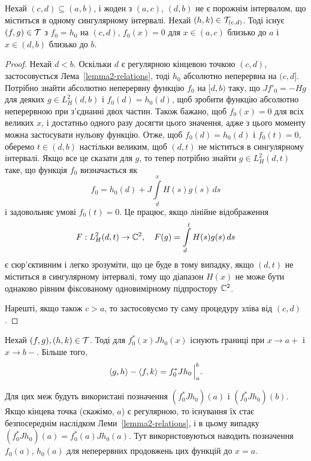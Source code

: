 \begin{lemma}\label{lemma-7-relations}
	Нехай $(c,d)\subseteq(a,b)$, і жоден з $(a,c)$, $(d,b)$ не є порожнім інтервалом, що міститься в одному сингулярному інтервалі. Нехай $(h,k)\in\mathcal{T}_{(c,d)}$. Тоді існує $(f,g)\in\mathcal{T}$ з $f_0=h_0$ на $(c,d)$, $f_0(x)=0$ для $x\in(a,c)$ близько до $a$ і $x\in(d,b)$ близько до $b$.
\end{lemma}
\begin{proof}
	Нехай $d<b$. Оскільки $d$ є регулярною кінцевою точкою $(c,d)$, застосовується Лема~\ref{lemma2-relations}, тоді $h_0$ абсолютно неперервна на $(c,d]$. Потрібно знайти абсолютно неперервну функцію $f_0$ на $[d,b)$ таку, що $Jf'_0=-Hg$ для деяких $g\in L^2_H(d,b)$ і $f_0(d)=h_0(d)$, щоб зробити функцію абсолютно неперервною при з'єднанні двох частин. Також бажано, щоб $f_0(x)=0$ для всіх великих $x$, і достатньо одного разу досягти цього значення, адже з цього моменту можна застосувати нульову функцію. Отже, щоб $f_0(d)=h_0(d)$ і $f_0(t)=0$, оберемо $t\in(d,b)$ настільки великим, щоб $(d,t)$ не міститься в сингулярному інтервалі. Якщо все це сказати для $g$, то тепер потрібно знайти $g\in L^2_H(d,t)$ таке, що функція $f_0$ визначається як
	\begin{equation*}
		f_0 = h_0(d) +J\int\limits_d^x H(s)g(s)\,ds
	\end{equation*}
	і задовольняє умові $f_0(t)=0$. Це працює, якщо лінійне відображення
	\begin{equation*}
		F:L^2_H(d,t)\to\mathbb{C}^2, \quad F(g) = \int\limits_d^t H(s)g(s)\,ds
	\end{equation*}
	є сюр'єктивним і легко зрозуміти, що це буде в тому випадку, якщо $(d,t)$ не міститься в сингулярному інтервалі, тому що діапазон $H(x)$ не може бути однаково рівним фіксованому одновимірному підпростору $\mathbb{C}^2$.

	Нарешті, якщо також $c>a$, то застосовуємо ту саму процедуру зліва від $(c,d)$.
\end{proof}

\begin{theorem}\label{th-relation-1}
	Нехай $(f,g), (h,k)\in \mathcal{T}$. Тоді для $f^*_0(x)Jh_0(x)$ існують границі при $x\to a+$ і $x\to b-$. Більше того,
	\begin{equation}\label{eq-relation-3}
	 	\left<g,h\right> - \left<f,k\right> =\Bigl. f^*_0Jh_0\,\Bigl|_a^b.
	\end{equation}
\end{theorem}

Для цих меж будуть використані позначення $(f^*_0Jh_0)(a)$ і $(f^*_0Jh_0)(b)$. Якщо кінцева точка (скажімо, $a$) є регулярною, то існування їх стає безпосереднім наслідком Леми~\ref{lemma2-relations}, і в цьому випадку $(f^*_0Jh_0)(a) = f^*_0(a)Jh_0(a)$. Тут використовуються наводить позначення $f_0(a)$, $h_0(a)$ для неперервних продовжень цих функцій до $x=a$.

